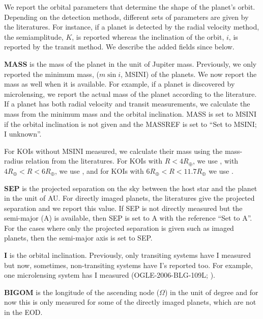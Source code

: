 \documentclass[11pt,preprint]{aastex}
\def\rearth{R_\oplus}
\begin{document}
\begin{CJK*}{UTF8}{gbsn}
We report the orbital parameters that determine the shape of the
planet's orbit. Depending on the detection methods, different sets of
parameters are given by the literatures. For instance, if a planet is
detected by the radial velocity method, the semiamplitude, $K$, is
reported whereas the inclination of the orbit, $i$, is reported by the
transit method. We describe the added fields since \cite{Wright2011}
below.  

{\bf MASS} is the mass of the planet in the unit of Jupiter
mass. Previously, we only reported the minimum mass, ($m\sin{i}$,
MSINI) of the planets. We now report the mass as well when it is
available. For example, if a planet is discovered by microlensing, we
report the actual mass of the planet according to the literature. If a
planet has both radial velocity and transit measurements, we calculate
the mass from the minimum mass and the orbital inclination. MASS is
set to MSINI if the orbital inclination is not given and the MASSREF
is set to ``Set to MSINI; I unknown''.  

For KOIs without MSINI measured, we calculate their mass using the
mass-radius relation from the literatures. For KOIs with $R<4\rearth$,
we use \cite{Weiss2014} , with $4\rearth<R<6\rearth$, we use
\cite{Lissauer2011}, and for KOIs with $6\rearth<R<11.7\rearth$ we use
\cite{Mordasini2012}.  

{\bf SEP} is the projected separation on the sky between the host star
and the planet in the unit of AU. For directly imaged planets, the
literatures give the projected separation and we report this value.
If SEP is not directly measured but the semi-major (A) is available,
then SEP is set to A with the reference ``Set to A''. For the cases
where only the projected separation is given such as imaged planets,
then the semi-major axis is set to SEP.

{\bf I} is the orbital inclination. Previously, only transiting
systems have I measured but now, sometimes, non-transiting systems
have I's reported too. For example, one microlensing system has I
measured (OGLE-2006-BLG-109L; \citealt{Bennet2010}).  

{\bf BIGOM} is the longitude of the ascending node ($\Omega$) in the
unit of degree and for now this is only measured for some of the
directly imaged planets, which are not in the EOD.


\end{CJK*}
\end{document}
